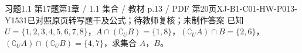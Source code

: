 \par\noindent\begin{minipage}{\linewidth}
\begin{bankitem}{习题1.1 第17题}{第1章 / 1.1 集合 / 教材 p.13 / PDF 第20页}{XJ-B1-C01-HW-P013-Y1531}{已对照原页转写题干及公式；待教师复核；未制作答案}
已知 $U=\{1,2,3,4,5,6,7,8\}$，$A\cap(\complement_U B)=\{1,8\}$，$(\complement_U A)\cap B=\{2,6\}$，$(\complement_U A)\cap(\complement_U B)=\{4,7\}$，求集合 $A$，$B$。
\end{bankitem}
\end{minipage}\par\medskip
